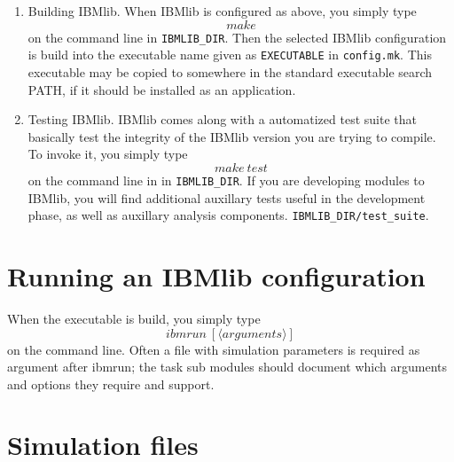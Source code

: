 \begin{enumerate}
    \item Building IBMlib. When IBMlib is configured as above, you simply type
          \[ make
          \]
          on the command line in  {\tt IBMLIB\_DIR}.
          Then the selected IBMlib configuration is build into the executable name
          given as {\tt EXECUTABLE} in {\tt config.mk}.
          This executable may be copied to somewhere in the standard executable 
          search PATH, if it should be installed as an application. 

    \item Testing IBMlib. IBMlib comes along with a automatized test suite
          that basically test the integrity of the IBMlib version you are trying to
          compile. To invoke it, you simply type
          \[ make \ test
          \]
          on the command line in in {\tt IBMLIB\_DIR}. 
          If you are developing modules to IBMlib, you will find additional auxillary
          tests useful in the development phase, as well as auxillary analysis components.
          {\tt IBMLIB\_DIR/test\_suite}. 

    \end{enumerate}      
       
\section{Running an IBMlib configuration}

When the executable is build, you simply type
\[ ibmrun \ [\langle arguments \rangle]
\]
on the command line. Often a file with simulation parameters is required 
as argument after ibmrun; the task sub modules should document which arguments 
and options they require and support.

\section{Simulation files}

